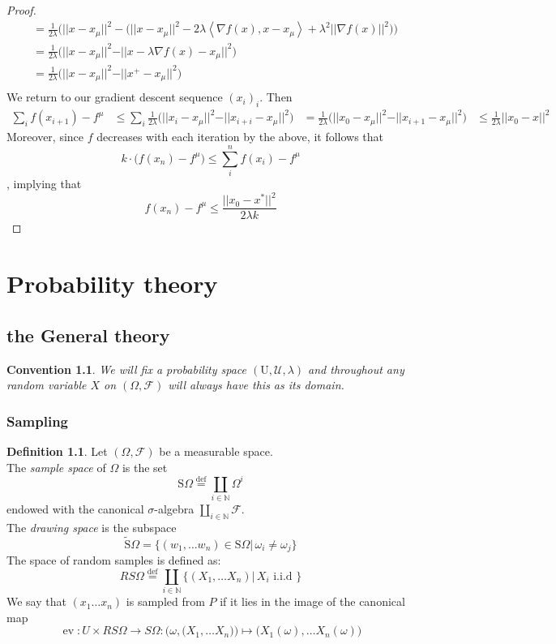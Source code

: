 \documentclass{book}
\theoremstyle{plain}
\newtheorem{convention}[corollary]{Convention}
\theoremstyle{definition}
\newtheorem{definition}[corollary]{Definition}
\newcommand{\bl}[2]{\left\langle #1,#2\right\rangle}
\renewcommand{\d}[1]{\mathbb{#1}}
\newcommand{\define}{\stackrel{\operatorname{def}}{=}}
\newcommand{\draw}[1]{\widetilde{\textrm{S}} #1}
\newcommand{\fun}{\mapsto}
\newcommand{\norm}[1]{\vert \vert #1 \vert \vert}
\DeclareMathOperator{\ev}{ev}
\newcommand{\mor}{\longrightarrow}
\renewcommand{\r}[1]{\mathcal{#1}}
\newcommand{\sample}[1]{\textrm{S} #1}
\renewcommand{\r}[1]{\mathcal{#1}}
\begin{document}
\begin{proof}
\begin{align*}
 & = \frac{1}{2\lambda}\bigg(\vert \vert x - x_\mu\vert \vert^2 -\big(\vert \vert x-x_\mu \vert \vert^2 -2\lambda \bl{\nabla f(x)}{x -x_\mu}+\lambda^2\vert \vert \nabla f(x)\vert \vert^2 \big)\bigg)\\
 &=\frac{1}{2\lambda}\bigg(\vert \vert x-x_\mu\vert \vert^2-\vert \vert x-\lambda \nabla f(x)-x_\mu \vert \vert^2 \bigg)\\
 &=\frac{1}{2\lambda}\bigg(\vert \vert x-x_\mu\vert \vert^2-\vert \vert x^+-x_\mu \vert \vert^2 \bigg)\\
 \end{align*}
We return to our gradient descent sequence $(x_i)_i$. Then
\begin{align*}
\sum_i f(x_{i+1})-f^\mu	& \le \sum_i \frac{1}{2\lambda}\bigg(\vert \vert x_i-x_\mu\vert \vert^2-\vert \vert x_{i+i}-x_\mu \vert \vert^2 \bigg)
&= \frac{1}{2\lambda}\bigg(\vert \vert x_0-x_\mu\vert \vert^2-\vert \vert x_{i+1}-x_\mu \vert \vert^2 \bigg)
&\le \frac{1}{2\lambda}\vert \vert x_0-x\vert\vert^2
\end{align*}
Moreover, since $f$ decreases with each iteration by the above, it follows that 
\[k\cdot \big(f(x_n)-f^\mu\big)\le \sum^n_i f(x_i)-f^\mu
\], implying that
\[
f(x_{n})-f^\mu\le \frac{\norm{x_0-x^*}^2}{2\lambda k}
\]
\end{proof}


\chapter{Probability theory}
\section{the General theory}
\begin{convention}\label{conv:prob_univ}
We will fix a probability space $(\textrm{U}, \r{U},\lambda)$ and throughout any random variable $X$ on $(\Omega,\r{F})$ will always have this as its domain.
\end{convention}
\subsection{Sampling}


\begin{definition}\label{mb:prob:def:sampling}
Let $(\Omega, \r{F})$ be a measurable space.\\
The \emph{sample space} of $\Omega$ is the set 
\[
\sample{\Omega}\define \coprod_{i \in \d{N}}\Omega^i
\]
endowed with the canonical $\sigma$-algebra $\coprod_{i \in \d{N}} \r{F}$.\\
The \emph{drawing space} is the subspace
\[
\draw{\Omega} = \big\{ (w_1,\ldots w_n) \in \sample{\Omega} \vert \, \omega_i\neq \omega_j \big\}
\]
The space of random samples is defined as:
\[
RS\Omega\define  \coprod_{i \in \d{N}} \bigg\{(X_1,\ldots X_n)\vert \, X_i \textrm{ i.i.d }\}
\] 
We say that $(x_1\ldots x_n)$ is sampled from $P$ if it lies in the image of the canonical map
\[
\ev: U\times RS\Omega\mor S\Omega: \bigg(\omega, \big(X_1,\ldots X_n\big)\bigg)\fun \bigg(X_1(\omega),\ldots X_n(\omega)\bigg)
\]
\end{definition}
\end{document}

